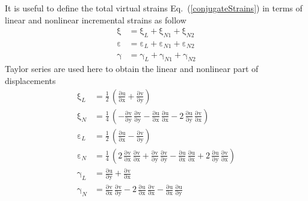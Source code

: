 It is useful to define the total virtual strains Eq.~(\ref{conjugateStrains}) in terms of linear and nonlinear incremental strains as follow
\begin{subequations}
	\begin{align}
	\mathrm  \xi & = \mathrm \xi_{L} + \mathrm  \xi_{N1} + \mathrm  \xi_{N2}\\
	\mathrm  \varepsilon & = \mathrm  \varepsilon_{L} + \mathrm  \varepsilon_{N1} + \mathrm  \varepsilon_{N2}\\
	\mathrm \gamma & = \mathrm  \gamma_{L} + \mathrm  \gamma_{N1} + \mathrm  \gamma_{N2}
	\end{align}
	\label{totalvirtualstrain}
\end{subequations}
Taylor series are used here to obtain the linear and nonlinear part of displacements 
\begin{subequations}
	\begin{align}
	\mathrm \xi_{L} & = \frac{1}{2} \, \left(\mathrm{\frac{\partial u}{\partial x}} + \mathrm{\frac{\partial v}{\partial y}}\right)\\
	\mathrm \xi_{N} & = \frac{1}{4} \, \left(- \mathrm{\frac{ \partial v}{\partial y}}\, \mathrm{\frac{ \partial v}{\partial y}} -\mathrm{\frac{\partial u}{\partial x}}\, \mathrm{\frac{\partial u}{\partial x}} - 2 \, \mathrm{\frac{\partial u}{\partial y}}\, \mathrm{\frac{\partial v}{\partial x}}\right)\\
	\mathrm \varepsilon_{L} & = \frac{1}{2} \, \left(\mathrm{\frac{\partial u}{\partial x}} - \mathrm{\frac{\partial v}{\partial y}}\right)\\
	\mathrm \varepsilon_{N} & = \frac{1}{4} \, \left(2 \, \mathrm{\frac{\partial v}{\partial x}}\, \mathrm{\frac{\partial v}{\partial x}} + \mathrm{\frac{ \partial v}{\partial y}}\, \mathrm{\frac{ \partial v}{\partial y}} -\mathrm{\frac{\partial u}{\partial x}}\, \mathrm{\frac{\partial u}{\partial x}} + 2 \, \mathrm{\frac{\partial u}{\partial y}}\, \mathrm{\frac{\partial v}{\partial x}}\right)\\
	\mathrm \gamma_{L} & = \mathrm{\frac{\partial u}{\partial y}} + \mathrm{\frac{\partial v}{\partial x}}\\
	\mathrm \gamma_{N} & = \mathrm{\frac{\partial v}{\partial x}}\, \mathrm{\frac{\partial v}{\partial y}} - 2\, \mathrm{\frac{ \partial u}{\partial x}}\, \mathrm{\frac{ \partial v}{\partial x}} 
	-\mathrm{\frac{\partial u}{\partial x}}\, \mathrm{\frac{\partial u}{\partial y}}
	\end{align}
\end{subequations}
